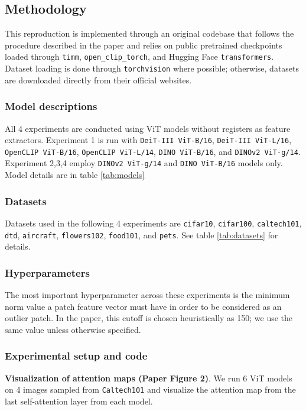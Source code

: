 \subsection{Methodology}

This reproduction is implemented through an original codebase that follows the procedure described in the paper and relies on public pretrained checkpoints loaded through \texttt{timm}, \texttt{open\_clip\_torch}, and Hugging Face \texttt{transformers}. Dataset loading is done through \texttt{torchvision} where possible; otherwise, datasets are downloaded directly from their official websites.

\subsubsection{Model descriptions}
All 4 experiments are conducted using ViT models without registers as feature extractors. Experiment 1 is run with \texttt{DeiT-III ViT-B/16}, \texttt{DeiT-III ViT-L/16}, \texttt{OpenCLIP ViT-B/16}, \texttt{OpenCLIP ViT-L/14}, \texttt{DINO ViT-B/16}, and \texttt{DINOv2 ViT-g/14}. Experiment 2,3,4 employ \texttt{DINOv2 ViT-g/14} and \texttt{DINO ViT-B/16} models only. Model details are in table \ref{tab:models}

\subsubsection{Datasets}
Datasets used in the following 4 experiments are \texttt{cifar10}, \texttt{cifar100}, \texttt{caltech101}, \texttt{dtd}, \texttt{aircraft}, \texttt{flowers102}, \texttt{food101}, and \texttt{pets}. See table \ref{tab:datasets} for details. 

\subsubsection{Hyperparameters}
The most important hyperparameter across these experiments is the minimum norm value a patch feature vector must have in order to be considered as an outlier patch. In the paper, this cutoff is chosen heuristically as 150; we use the same value unless otherwise specified.

\subsubsection{Experimental setup and code}

\textbf{Visualization of attention maps (Paper Figure 2)}. We run 6 ViT models on 4 images sampled from \texttt{Caltech101} and visualize the attention map from the last self-attention layer from each model. 

